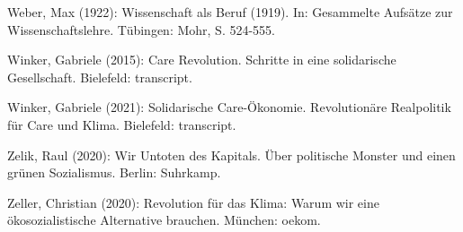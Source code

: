 \begin{multicols*}{2}
\begin{bibdescription}
        \item Weber, Max (1922): Wissenschaft als Beruf (1919). In: Gesammelte Aufsätze zur Wissenschaftslehre. Tübingen: Mohr, S. 524-555.
        \item Winker, Gabriele (2015): Care Revolution. Schritte in eine solidarische Gesellschaft. Bielefeld: transcript.
        \item Winker, Gabriele (2021): Solidarische Care-Ökonomie. Revolutionäre Realpolitik für Care und Klima. Bielefeld: transcript.
        \item Zelik, Raul (2020): Wir Untoten des Kapitals. Über politische Monster und einen grünen Sozialismus. Berlin: Suhrkamp.
        \item Zeller, Christian (2020): Revolution für das Klima: Warum wir eine ökosozialistische Alternative brauchen. München: oekom.
        
        
\end{bibdescription}
\end{multicols*}
